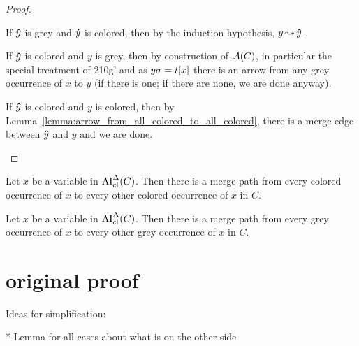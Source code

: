\documentclass[,%
	paper=a4,%
	DIV11, %
	twoside=false,%
	liststotoc,
	bibtotoc,
	draft=false,%
	numbers=noendperiod
]{scrartcl}
\begin{document}
\begin{proof}
\begin{description}
				If $\bm\hat y$ is grey and $\bm\dot y$ is colored, then by the induction hypothesis, $y \operatorname{\leadsto} \bm\hat y$ . 

				If $\bm\hat y$ is colored and $y$ is grey,
				then by construction of $\operatorname{\mathcal{A}}(C)$, in particular the special treatment of 210g' and as $y\sigma = t[x]$ there is an arrow from any grey occurrence of $x$ to $y$ (if there is one; if there are none, we are done anyway).



				If $\bm\hat y$ is colored and $y$ is colored, then by Lemma~\ref{lemma:arrow_from_all_colored_to_all_colored}, there is a merge edge between $\bm\hat y$ and $y$ and we are done.
\qedhere
		\end{description}
\end{proof}

\begin{clemma}
	\label{lemma:arrow_from_all_colored_to_all_colored}
	Let $x$ be a variable in $\operatorname{AI}_\mathrm{cl}^\Delta(C)$.
	Then there is a merge path from every colored occurrence of $x$ to every other colored occurrence of $x$ in $C$.
\end{clemma}

\begin{clemma}
	\label{lemma:arrow_from_grey_to_grey}
	Let $x$ be a variable in $\operatorname{AI}_\mathrm{cl}^\Delta(C)$.
	Then there is a merge path from every grey occurrence of $x$ to every other grey occurrence of $x$ in $C$.
\end{clemma}




\section{original proof}

Ideas for simplification:

* Lemma for all cases about what is on the other side
\end{document}
